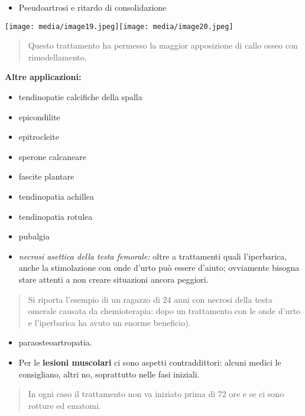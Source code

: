 \documentclass[]{article}
\begin{document}
\begin{itemize}
\item
  Pseudoartrosi e ritardo di consolidazione
\end{itemize}

\texttt{[image: media/image19.jpeg]}\texttt{[image: media/image20.jpeg]}

\begin{quote}
Questo trattamento ha permesso la maggior apposizione di callo osseo con
rimodellamento.
\end{quote}

\textbf{Altre applicazioni:}

\begin{itemize}
\item
  tendinopatie calcifiche della spalla
\item
  epicondilite
\item
  epitrocleite
\item
  sperone calcaneare
\item
  fascite plantare
\item
  tendinopatia achillea
\item
  tendinopatia rotulea
\item
  pubalgia
\item
  \emph{necrosi asettica della testa femorale:} oltre a trattamenti
  quali l'iperbarica, anche la stimolazione con onde d'urto può essere
  d'aiuto; ovviamente bisogna stare attenti a non creare situazioni
  ancora peggiori.
\end{itemize}

\begin{quote}
Si riporta l'esempio di un ragazzo di 24 anni con necrosi della testa
omerale causata da chemioterapia: dopo un trattamento con le onde d'urto
e l'iperbarica ha avuto un enorme beneficio).
\end{quote}

\begin{itemize}
\item
  paraosteoartropatia.
\item
  Per le \textbf{lesioni muscolari} ci sono aspetti contraddittori:
  alcuni medici le consigliano, altri no, soprattutto nelle fasi
  iniziali.
\end{itemize}

\begin{quote}
In ogni caso il trattamento non va iniziato prima di 72 ore e se ci sono
rotture ed ematomi.
\end{quote}
\end{document}

